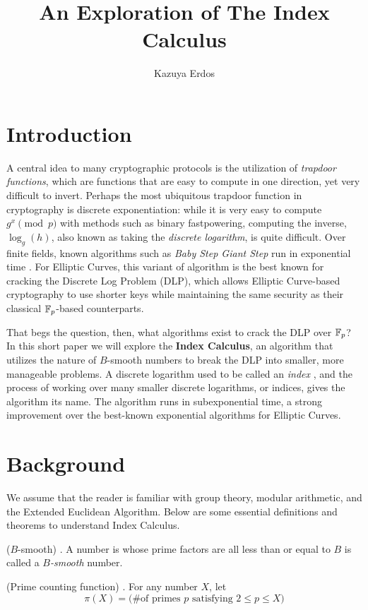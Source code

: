 \documentclass[]{math_paper}
\author{Kazuya Erdos}
\title{An Exploration of The Index Calculus}
\begin{document}
\maketitle
\section{Introduction}
A central idea to many cryptographic protocols is the utilization of \emph{trapdoor functions}, which are functions that are easy to compute in one direction, yet very difficult to invert. Perhaps the most ubiquitous trapdoor function in cryptography is discrete exponentiation: while it is very easy to compute $g^x \pmod p$ with methods such as binary fastpowering, computing the inverse, $\log_g(h)$, also known as taking the \emph{discrete logarithm}, is quite difficult. Over finite fields, known algorithms such as \emph{Baby Step Giant Step} run in exponential time \cite{Hoffstein2008}. For Elliptic Curves, this variant of algorithm is the best known for cracking the Discrete Log Problem (DLP), which allows Elliptic Curve-based cryptography to use shorter keys while maintaining the same security as their classical $\mathbb{F}_p$-based counterparts.

That begs the question, then, what algorithms exist to crack the DLP over $\mathbb{F}_p$? In this short paper we will explore the \textbf{Index Calculus}, an algorithm that utilizes the nature of $B$-smooth numbers to break the DLP into smaller, more manageable problems. A discrete logarithm used to be called an \emph{index} \cite{Hoffstein2008}, and the process of working over many smaller discrete logarithms, or indices, gives the algorithm its name. The algorithm runs in subexponential time, a strong improvement over the best-known exponential algorithms for Elliptic Curves.
\section{Background} \label{sec:background}
We assume that the reader is familiar with group theory, modular arithmetic, and the Extended Euclidean Algorithm. Below are some essential definitions and theorems to understand Index Calculus.

\begin{definition} ($B$-smooth) \cite{Hoffstein2008}. A number is whose prime factors are all less than or equal to $B$ is called a \emph{$B$-smooth} number.
\end{definition}

\begin{definition} (Prime counting function) \cite{Hoffstein2008}. For any number $X$, let
    \[
        \pi(X) = \text{(\# of primes $p$ satisfying $2 \leq p \leq X$)}
    \]
\end{definition}
\end{document}
